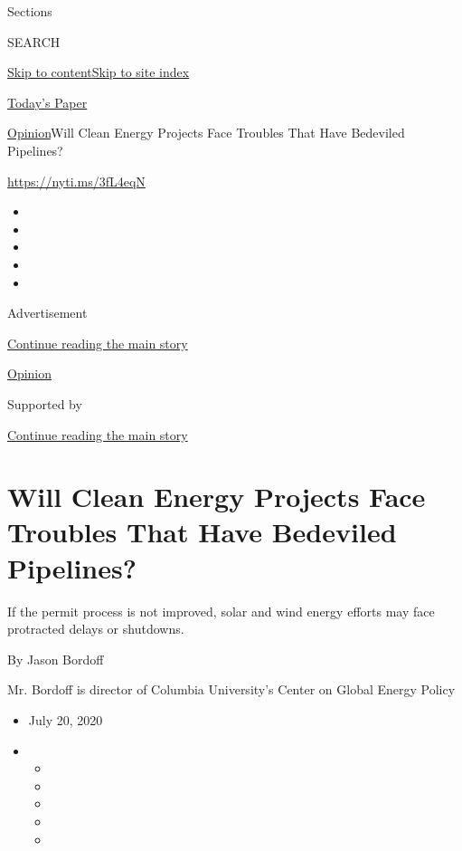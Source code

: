 Sections

SEARCH

\protect\hyperlink{site-content}{Skip to
content}\protect\hyperlink{site-index}{Skip to site index}

\href{https://myaccount.nytimes3xbfgragh.onion/auth/login?response_type=cookie\&client_id=vi}{}

\href{https://www.nytimes3xbfgragh.onion/section/todayspaper}{Today's
Paper}

\href{/section/opinion}{Opinion}\textbar{}Will Clean Energy Projects
Face Troubles That Have Bedeviled Pipelines?

\url{https://nyti.ms/3fL4eqN}

\begin{itemize}
\item
\item
\item
\item
\item
\end{itemize}

Advertisement

\protect\hyperlink{after-top}{Continue reading the main story}

\href{/section/opinion}{Opinion}

Supported by

\protect\hyperlink{after-sponsor}{Continue reading the main story}

\hypertarget{will-clean-energy-projects-face-troubles-that-have-bedeviled-pipelines}{%
\section{Will Clean Energy Projects Face Troubles That Have Bedeviled
Pipelines?}\label{will-clean-energy-projects-face-troubles-that-have-bedeviled-pipelines}}

If the permit process is not improved, solar and wind energy efforts may
face protracted delays or shutdowns.

By Jason Bordoff

Mr. Bordoff is director of Columbia University's Center on Global Energy
Policy

\begin{itemize}
\item
  July 20, 2020
\item
  \begin{itemize}
  \item
  \item
  \item
  \item
  \item
  \end{itemize}
\end{itemize}

